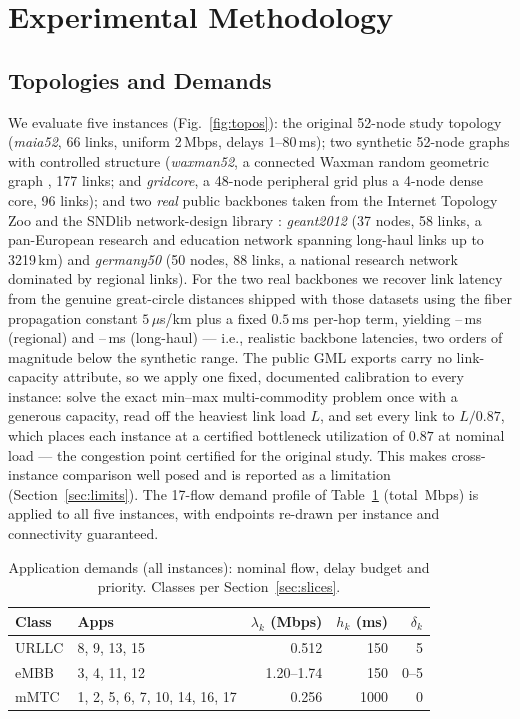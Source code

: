 \documentclass[journal]{IEEEtran}
\begin{document}
\section{Experimental Methodology}
\label{sec:setup}
\subsection{Topologies and Demands}
We evaluate five instances (Fig.~\ref{fig:topos}): the original 52-node study
topology (\emph{maia52}, 66 links, uniform 2\,Mbps, delays 1--80\,ms); two
synthetic 52-node graphs with controlled structure (\emph{waxman52}, a
connected Waxman random geometric graph \cite{waxman1988}, 177 links; and
\emph{gridcore}, a 48-node peripheral grid plus a 4-node dense core, 96
links); and two \emph{real} public backbones taken from the Internet Topology
Zoo \cite{topozoo} and the SNDlib network-design library \cite{sndlib2016}:
\emph{geant2012} (37 nodes, 58 links, a pan-European research and education
network spanning long-haul links up to 3219\,km) and \emph{germany50} (50 nodes,
88 links, a national research network dominated by regional links). For the two
real backbones we recover link latency from the genuine great-circle distances
shipped with those datasets using the fiber propagation constant
$5\,\mu$s/km plus a fixed $0.5$\,ms per-hop term, yielding
\AntDelayGerMin--\AntDelayGerMax\,ms (regional) and
\AntDelayGeantMin--\AntDelayGeantMax\,ms (long-haul) --- i.e., realistic
backbone latencies, two orders of magnitude below the synthetic range. The
public GML exports carry no link-capacity attribute, so we apply one fixed,
documented calibration to every instance: solve the exact min--max
multi-commodity problem once with a generous capacity, read off the heaviest
link load $L$, and set every link to $L/0.87$, which places each instance at a
certified bottleneck utilization of $0.87$ at nominal load --- the congestion
point certified for the original study. This makes cross-instance comparison
well posed and is reported as a limitation (Section~\ref{sec:limits}). The
17-flow demand profile of Table~\ref{tab:apps} (total \TotalDemand\,Mbps) is
applied to all five instances, with endpoints re-drawn per instance and
connectivity guaranteed.

\begin{table}[!t]
\caption{Application demands (all instances): nominal flow, delay budget
and priority. Classes per Section~\ref{sec:slices}.}
\label{tab:apps}
\centering
\begin{tabular}{@{}llrrr@{}}
\toprule
Class & Apps & $\lambda_k$ (Mbps) & $h_k$ (ms) & $\delta_k$\\
\midrule
URLLC & 8, 9, 13, 15 & 0.512 & 150 & 5\\
eMBB  & 3, 4, 11, 12  & 1.20--1.74 & 150 & 0--5\\
mMTC  & 1, 2, 5, 6, 7, 10, 14, 16, 17 & 0.256 & 1000 & 0\\
\bottomrule
\end{tabular}
\end{table}
\end{document}
